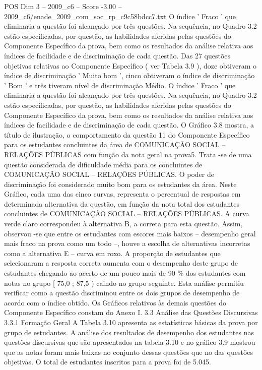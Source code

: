 \begin{textsample}{POS Dim 3 – 2009\_c6 – Score -3.00 – 2009\_c6/enade\_2009\_com\_soc\_rp\_c9c58bdcc7.txt}
O índice ' Fraco ' que eliminaria a questão foi alcançado por três questões.
Na sequência, no Quadro 3.2 estão especificadas, por questão, as habilidades aferidas pelas questões do Componente Específico da prova, bem como os resultados da análise relativa aos índices de facilidade e de discriminação de cada questão.
Das 27 questões objetivas relativas ao Componente Específico ( ver Tabela 3.9 ), doze obtiveram o índice de discriminação ' Muito bom ', cinco obtiveram o índice de discriminação ' Bom ' e três tiveram nível de discriminação Médio.
O índice ' Fraco ' que eliminaria a questão foi alcançado por três questões.
Na sequência, no Quadro 3.2 estão especificadas, por questão, as habilidades aferidas pelas questões do Componente Específico da prova, bem como os resultados da análise relativa aos índices de facilidade e de discriminação de cada questão.
O Gráfico 3.8 mostra, a título de ilustração, o comportamento da questão 11 do Componente Específico para os estudantes concluintes da área de COMUNICAÇÃO SOCIAL – RELAÇÕES PÚBLICAS com função da nota geral na prova5.
Trata -se de uma questão considerada de dificuldade média para os concluintes de COMUNICAÇÃO SOCIAL – RELAÇÕES PÚBLICAS.
O poder de discriminação foi considerado muito bom para os estudantes da área.
Neste Gráfico, cada uma das cinco curvas, representa o percentual de respostas em determinada alternativa da questão, em função da nota total dos estudantes concluintes de COMUNICAÇÃO SOCIAL – RELAÇÕES PÚBLICAS.
A curva verde claro correspondeu à alternativa B, a correta para esta questão.
Assim, observou -se que entre os estudantes com escores mais baixos – desempenho geral mais fraco na prova como um todo –, houve a escolha de alternativas incorretas como a alternativa E – curva em roxo.
A proporção de estudantes que selecionaram a resposta correta aumenta com o desempenho deste grupo de estudantes chegando ao acerto de um pouco mais de 90 \% dos estudantes com notas no grupo [ 75,0 ; 87,5 ) caindo no grupo seguinte.
Esta análise permitiu verificar como a questão discriminou entre os dois grupos de desempenho de acordo com o índice obtido.
Os Gráficos relativos às demais questões do Componente Específico constam do Anexo I. 3.3 Análise das Questões Discursivas 3.3.1 Formação Geral A Tabela 3.10 apresenta as estatísticas básicas da prova por grupo de estudantes.
A análise dos resultados de desempenho dos estudantes nas questões discursivas que são apresentados na tabela 3.10 e no gráfico 3.9 mostrou que as notas foram mais baixas no conjunto dessas questões que no das questões objetivas.
O total de estudantes inscritos para a prova foi de 5.045.

\end{textsample}
